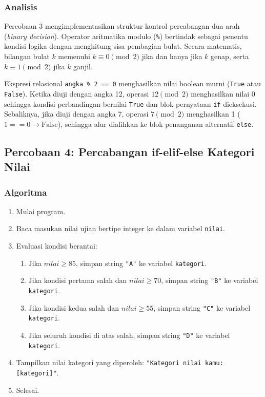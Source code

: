 \documentclass[12pt,a4paper]{article}
\begin{document}
\subsubsection{Analisis}
Percobaan 3 mengimplementasikan struktur kontrol percabangan dua arah (\textit{binary decision}). Operator aritmatika modulo (\texttt{\%}) bertindak sebagai penentu kondisi logika dengan menghitung sisa pembagian bulat. Secara matematis, bilangan bulat $k$ memenuhi $k \equiv 0 \pmod 2$ jika dan hanya jika $k$ genap, serta $k \equiv 1 \pmod 2$ jika $k$ ganjil.

Ekspresi relasional \texttt{angka \% 2 == 0} menghasilkan nilai boolean murni (\texttt{True} atau \texttt{False}). Ketika diuji dengan angka 12, operasi $12 \pmod 2$ menghasilkan nilai 0 sehingga kondisi perbandingan bernilai \texttt{True} dan blok pernyataan \texttt{if} dieksekusi. Sebaliknya, jika diuji dengan angka 7, operasi $7 \pmod 2$ menghasilkan 1 ($1 == 0 \to \text{False}$), sehingga alur dialihkan ke blok penanganan alternatif \texttt{else}.

\subsection{Percobaan 4: Percabangan if-elif-else Kategori Nilai}
\subsubsection{Algoritma}
\begin{enumerate}
    \item Mulai program.
    \item Baca masukan nilai ujian bertipe integer ke dalam variabel \texttt{nilai}.
    \item Evaluasi kondisi berantai:
    \begin{enumerate}[label=\alph*.]
        \item Jika $nilai \ge 85$, simpan string \texttt{"A"} ke variabel \texttt{kategori}.
        \item Jika kondisi pertama salah dan $nilai \ge 70$, simpan string \texttt{"B"} ke variabel \texttt{kategori}.
        \item Jika kondisi kedua salah dan $nilai \ge 55$, simpan string \texttt{"C"} ke variabel \texttt{kategori}.
        \item Jika seluruh kondisi di atas salah, simpan string \texttt{"D"} ke variabel \texttt{kategori}.
    \end{enumerate}
    \item Tampilkan nilai kategori yang diperoleh: \texttt{"Kategori nilai kamu: [kategori]"}.
    \item Selesai.
\end{enumerate}
\end{document}

